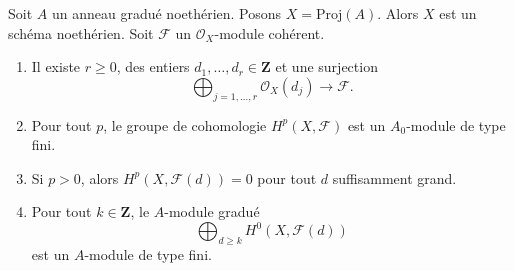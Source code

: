 \begin{lemma}
\label{lemma-coherent-on-proj-general}
Soit $A$ un anneau gradué noethérien. Posons $X = \text{Proj}(A)$. Alors $X$
est un schéma noethérien. Soit $\mathcal{F}$ un $\mathcal{O}_X$-module
cohérent.
\begin{enumerate}
\item Il existe $r \geq 0$, des entiers
$d_1, \ldots, d_r \in \mathbf{Z}$ et une surjection
$$
\bigoplus\nolimits_{j = 1, \ldots, r} \mathcal{O}_X(d_j)
\longrightarrow \mathcal{F}.
$$
\item Pour tout $p$, le groupe de cohomologie $H^p(X, \mathcal{F})$ est un
$A_0$-module de type fini.
\item Si $p > 0$, alors $H^p(X, \mathcal{F}(d)) = 0$ pour tout $d$
suffisamment grand.
\item Pour tout $k \in \mathbf{Z}$, le $A$-module gradué
$$
\bigoplus\nolimits_{d \geq k} H^0(X, \mathcal{F}(d))
$$
est un $A$-module de type fini.
\end{enumerate}
\end{lemma}


